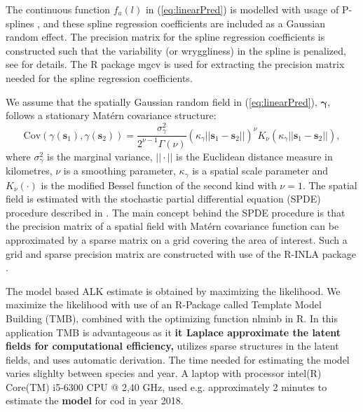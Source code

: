 \documentclass[a4paper 12pt]{article}
\numberwithin{equation}{section}
\begin{document}
The continuous function $f_a(l)$ in (\ref{eq:linearPred}) is modelled with usage of P-splines \citep{wood2017generalized}, and these spline regression coefficients are included as a Gaussian random effect. The precision matrix for the spline regression coefficients is constructed such that the variability (or wryggliness) in the spline is penalized, see \citet[page 239]{wood2017generalized} for details. The R package mgcv \citep{wood2015package} is used for extracting the precision matrix needed for the spline regression coefficients.

\indent We assume that the spatially Gaussian random field in (\ref{eq:linearPred}), $\pmb{\gamma}$, follows a stationary Mat\'{e}rn covariance structure:
\begin{equation}\label{eq:matern}
 \text{Cov}(\gamma(\mathbf{s}_1),\gamma(\mathbf{s}_2)) = \frac{\sigma^2_{\gamma}}{2^{\nu-1}\Gamma(\nu)}(\kappa_{\gamma}||\mathbf{s}_1 -\mathbf{s}_2||)^{\nu}K_{\nu}(\kappa_{\gamma}||\mathbf{s}_1-\mathbf{s}_2||),
\end{equation}
where $\sigma^2_{\gamma}$ is the marginal variance, $||\cdot||$ is the Euclidean distance measure in kilometres, $\nu$ is a smoothing parameter, $\kappa_{\gamma}$ is a spatial scale parameter and $K_{\nu}(\cdot)$ is the modified Bessel function of the second kind with $\nu = 1$. The spatial field is estimated with the stochastic partial differential equation (SPDE) procedure described in \citet{lindgren2011explicit}. The main concept behind the SPDE procedure is that the precision matrix of a spatial field with Mat\'{e}rn  covariance function can be approximated by a sparse matrix on a grid covering the area of interest. Such a grid and sparse precision matrix are constructed with use of the R-INLA package \citep{rue2009approximate}.

The model based ALK estimate is obtained by maximizing the likelihood. We maximize the likelihood with use of an R-Package called Template Model Building ({\sffamily TMB}),  \citep{kristensen2015tmb} combined with the optimizing function {\sffamily nlminb} in R. In this application {\sffamily TMB} is advantageous as it {\bf it Laplace approximate the latent fields for computational efficiency,} utilizes sparse structures in the latent fields, and uses automatic derivation. The time needed for estimating the model varies slighlty between species and year. A laptop with  processor intel(R) Core(TM) i5-6300 CPU @ 2,40 GHz, used e.g. approximately 2 minutes to estimate the {\bf model} for cod in year 2018.
\end{document}
